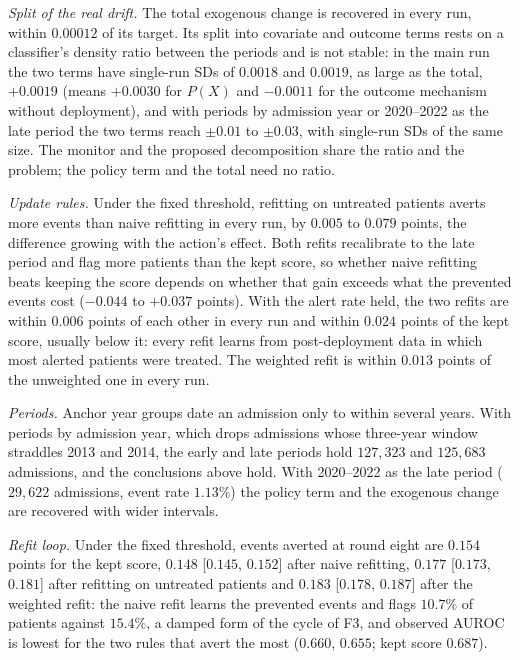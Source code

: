 \documentclass[letterpaper]{article} %
\begin{document}
\emph{Split of the real drift.} The total exogenous change is recovered in
every run, within $0.00012$ of its target. Its split into covariate and
outcome terms rests on a classifier's density ratio between the periods and is
not stable: in the main run the two terms have single-run SDs of $0.0018$ and
$0.0019$, as large as the total, $+0.0019$ (means $+0.0030$ for $P(X)$ and $-0.0011$ for
the outcome mechanism without deployment), and with periods by admission year
or 2020--2022 as the late period the two terms reach $\pm 0.01$ to
$\pm 0.03$, with single-run SDs of the same size. The monitor and the proposed
decomposition share the ratio and the problem; the policy term and the total
need no ratio.

\emph{Update rules.} Under the fixed threshold, refitting on untreated
patients averts more events than naive refitting in every run, by $0.005$ to
$0.079$ points, the difference growing with the action's effect. Both refits
recalibrate to the late period and flag more patients than the kept score, so
whether naive refitting beats keeping the score depends on whether that gain
exceeds what the prevented events cost ($-0.044$ to $+0.037$ points). With
the alert rate held, the two refits are within $0.006$ points of each other in
every run and within $0.024$ points of the kept score, usually below it: every
refit learns from post-deployment data in which most alerted patients were
treated. The weighted refit is within $0.013$ points of the unweighted one in
every run.

\emph{Periods.} Anchor year groups date an admission only to within several
years. With periods by admission year, which drops admissions whose
three-year window straddles 2013 and 2014, the early and late periods hold
$127{,}323$ and $125{,}683$ admissions, and the conclusions above hold. With
2020--2022 as the late period ($29{,}622$ admissions, event rate $1.13\%$) the
policy term and the exogenous change are recovered with wider intervals.


\emph{Refit loop.} Under the fixed
threshold, events averted at round eight are $0.154$ points for the kept
score, $0.148$ [$0.145$, $0.152$] after naive refitting, $0.177$ [$0.173$,
$0.181$] after refitting on untreated patients and $0.183$ [$0.178$, $0.187$]
after the weighted refit: the naive refit learns the
prevented events and flags $10.7\%$ of patients against $15.4\%$, a damped
form of the cycle of F3, and observed AUROC is lowest for the two rules
that avert the most ($0.660$, $0.655$; kept score $0.687$).
\end{document}

